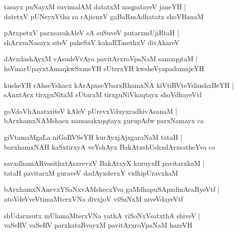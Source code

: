 \documentclass[twoside,12pt,openright]{book}
\newcounter{shloka}[chapter]
\begin{document}
\begin{shloka}%
tasayx puNayxM suvimalAM datatxM naqpatayeV janeYH |\\
datetxV pUNeyxVtha sa rAjicnxV gaBaRmAdhatatx shoVBanaM
\end{shloka}

\begin{shloka}%
pArxpetxV parxsavakAleV sA suSuveV putarxmUjiRtaH |\\
shArxvaNasayx siteV pakeSxV kakaRTasethxV divAkareV 
\end{shloka}

\begin{shloka}%
dAvxdashAyxM vAsudeVvAya pavitArxroVpaNaM samxqqtaM |\\
heVmarUpayxtAmaqkwSxmeYH sUterxYH kwsheVyapadamxjeYH
\end{shloka}

\begin{shloka}%
kusheYH rAhseYshacx kArApxseYbarxRhamxNA kiVtiRVteYshushxBeYH |\\
sAnxtAvx tirxguNitaM sUtarxM tirxguNiVkaqtayx shoVdhayeVtf
\end{shloka}

\begin{shloka}%
goVdoVhAnatxriteV kAleV pUrevxVduyxradhivAsanaM |\\
bArxhamxNAMshacx namasakxqqtayx gurupAdw parxNamayx ca 
\end{shloka}

\begin{shloka}%
giVtamaMgaLa niGoRVSeYH kurAyxjAjxgaraNaM tataH |\\
barxhamxNAH kaSxtirxyA veYshAyx BakAtxshUshxdArxsatheYva ca 
\end{shloka}

\begin{shloka}%
savxdhamARvasithxtAsxrevxV BakAtxyX kuruyxH pavitarxkaM |\\
tataH pavitarxM guraveV dadAyxdevxY vidhipUravxkaM 
\end{shloka}

\begin{shloka}%
bArxhamxNAnevxYSaNxvAMshecxYva gaMdhapuSApxdinAcaRyeVtf |\\
atoVdeVveVtimaMterxVNa divxjoV viSuNxM niveVdayeVtf
\end{shloka}

\begin{shloka}%
shUdarxsutx mUlamaMterxVNa yathA viSoNxVsatxthA shiveV |\\
vaSeRV vaSeRV parxkataRvayxM pavitArxroVpaNaM hareVH
\end{shloka}
\end{document}
